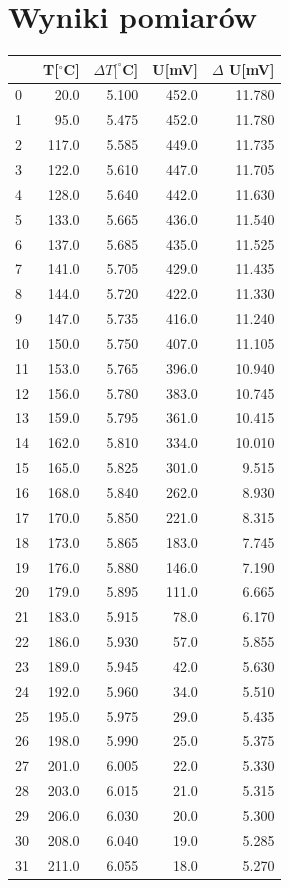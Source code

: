 \documentclass[a4paper,10pt]{article}
\begin{document}
\section{Wyniki pomiarów}
\begin{tabular}{lrrrr}
\hline
{} &T[$^\circ$C]&$\Delta T[^\circ$C]&U[mV]&$\Delta$ U[mV]\\
\hline
0  &   20.0 &  5.100 &  452.0 &  11.780 \\
1  &   95.0 &  5.475 &  452.0 &  11.780 \\
2  &  117.0 &  5.585 &  449.0 &  11.735 \\
3  &  122.0 &  5.610 &  447.0 &  11.705 \\
4  &  128.0 &  5.640 &  442.0 &  11.630 \\
5  &  133.0 &  5.665 &  436.0 &  11.540 \\
6  &  137.0 &  5.685 &  435.0 &  11.525 \\
7  &  141.0 &  5.705 &  429.0 &  11.435 \\
8  &  144.0 &  5.720 &  422.0 &  11.330 \\
9  &  147.0 &  5.735 &  416.0 &  11.240 \\
10 &  150.0 &  5.750 &  407.0 &  11.105 \\
11 &  153.0 &  5.765 &  396.0 &  10.940 \\
12 &  156.0 &  5.780 &  383.0 &  10.745 \\
13 &  159.0 &  5.795 &  361.0 &  10.415 \\
14 &  162.0 &  5.810 &  334.0 &  10.010 \\
15 &  165.0 &  5.825 &  301.0 &   9.515 \\
16 &  168.0 &  5.840 &  262.0 &   8.930 \\
17 &  170.0 &  5.850 &  221.0 &   8.315 \\
18 &  173.0 &  5.865 &  183.0 &   7.745 \\
19 &  176.0 &  5.880 &  146.0 &   7.190 \\
20 &  179.0 &  5.895 &  111.0 &   6.665 \\
21 &  183.0 &  5.915 &   78.0 &   6.170 \\
22 &  186.0 &  5.930 &   57.0 &   5.855 \\
23 &  189.0 &  5.945 &   42.0 &   5.630 \\
24 &  192.0 &  5.960 &   34.0 &   5.510 \\
25 &  195.0 &  5.975 &   29.0 &   5.435 \\
26 &  198.0 &  5.990 &   25.0 &   5.375 \\
27 &  201.0 &  6.005 &   22.0 &   5.330 \\
28 &  203.0 &  6.015 &   21.0 &   5.315 \\
29 &  206.0 &  6.030 &   20.0 &   5.300 \\
30 &  208.0 &  6.040 &   19.0 &   5.285 \\
31 &  211.0 &  6.055 &   18.0 &   5.270 \\
\hline
\end{tabular}
\end{document}
